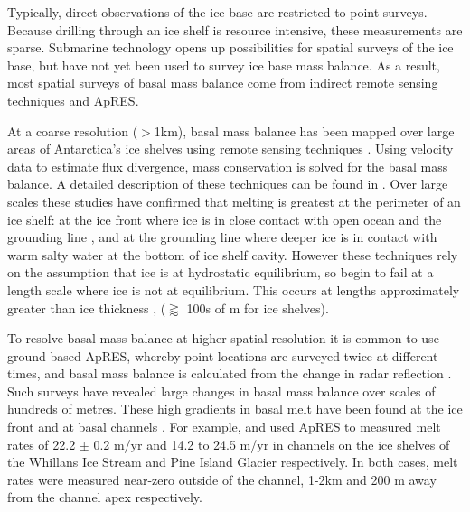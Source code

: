 
Typically, direct observations of the ice base are restricted to point surveys. Because drilling through an ice shelf is resource intensive, these measurements are sparse.  Submarine technology opens up possibilities for spatial surveys of the ice base, but have not yet been used to survey ice base mass balance.
As a result, most spatial surveys of basal mass balance come from indirect remote sensing techniques and ApRES.  

At a coarse resolution ($>$1km), basal mass balance has been mapped over large areas of Antarctica's ice shelves using remote sensing techniques \citep[e.g.][] {rignot2013ice, mankoff2012role,goldberg2019accurately}. Using velocity data to estimate flux divergence, mass conservation is solved for the basal mass balance. A detailed description of these techniques can be found in \cite{berger2017detecting}.
Over large scales these studies have confirmed that melting is greatest at the perimeter of an ice shelf: at the ice front where ice is in close contact with open ocean and the grounding line \citep[e.g.][] {rignot2013ice, mankoff2012role,goldberg2019accurately}, and at the grounding line where deeper ice is in contact with warm salty water at the bottom of ice shelf cavity. 
However these techniques rely on the assumption that ice is at hydrostatic equilibrium, so  begin to fail at a length scale where ice is not at equilibrium. This occurs at lengths approximately greater than ice thickness \citep{gudmundsson2008limit},  ($\gtrapprox$ 100s of m for ice shelves).

To resolve basal mass balance at higher spatial resolution it is common to use ground based ApRES, whereby point locations are surveyed twice at different times, and basal mass balance is calculated from the change in radar reflection \citep{stanton2013channelized, dutrieux2014basal,marsh2016high}. Such surveys have revealed large changes in basal mass balance over scales of hundreds of metres. These high gradients in basal melt have been found at the ice front \cite[e.g.][]{stewart2019basal} and at basal channels \citep[e.g.][]{stanton2013channelized, marsh2016high}. 
For example, \cite {marsh2016high} and \cite{stanton2013channelized} used ApRES to measured melt rates of 22.2 $\pm$ 0.2 m/yr and 14.2 to 24.5 m/yr in channels on the ice shelves of the Whillans Ice Stream and Pine Island Glacier respectively. In both cases, melt rates were measured near-zero outside of the channel, 1-2km and 200 m away from the channel apex respectively.

